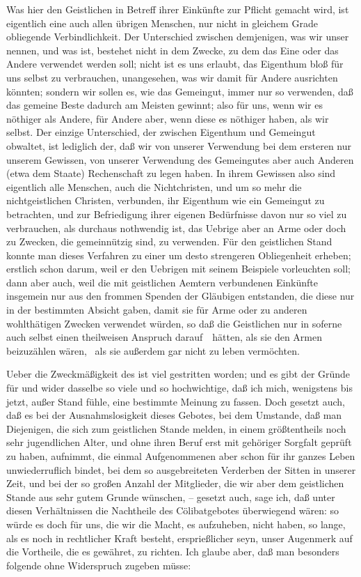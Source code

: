 \begin{aufza}
\item Was hier den Geistlichen in Betreff ihrer Einkünfte zur Pflicht gemacht wird, ist eigentlich eine auch allen übrigen Menschen, nur nicht in gleichem Grade obliegende Verbindlichkeit. Der Unterschied zwischen demjenigen, was wir unser  nennen, und was  ist, bestehet nicht in dem Zwecke, zu dem das Eine oder das Andere verwendet werden soll; nicht ist es uns erlaubt, das Eigenthum bloß für uns selbst zu verbrauchen, unangesehen, was wir damit für Andere ausrichten könnten; sondern wir sollen es, wie das Gemeingut, immer nur so verwenden, daß das gemeine Beste dadurch am Meisten gewinnt; also für uns, wenn wir es nöthiger als Andere, für Andere aber, wenn diese es nöthiger haben, als wir selbst. Der einzige Unterschied, der zwischen Eigenthum und Gemeingut obwaltet, ist lediglich der, daß wir von unserer Verwendung bei dem ersteren nur unserem Gewissen, von unserer Verwendung des Gemeingutes aber auch Anderen (etwa dem Staate) Rechenschaft zu legen haben. In ihrem Gewissen also sind eigentlich alle Menschen, auch die Nichtchristen, und um so mehr die nichtgeistlichen Christen, verbunden, ihr Eigenthum wie ein Gemeingut zu betrachten, und zur Befriedigung ihrer eigenen Bedürfnisse davon nur so viel zu verbrauchen, als durchaus nothwendig ist, das Uebrige aber an Arme oder doch zu Zwecken, die gemeinnützig sind, zu verwenden. Für den geistlichen Stand konnte man dieses Verfahren zu einer um desto strengeren Obliegenheit erheben; erstlich schon darum, weil er den Uebrigen mit seinem Beispiele vorleuchten soll; dann aber auch, weil die mit geistlichen Aemtern verbundenen Einkünfte insgemein nur aus den frommen Spenden der Gläubigen entstanden, die diese nur in der bestimmten Absicht gaben, damit sie für Arme oder zu anderen wohlthätigen Zwecken verwendet würden, so daß die Geistlichen nur in soferne auch selbst einen theilweisen Anspruch darauf~\ hätten, als sie den Armen beizuzählen wären, \dh\  als sie außerdem gar nicht zu leben vermöchten.
\item Ueber die Zweckmäßigkeit des  ist viel gestritten worden; und es gibt der Gründe für und wider dasselbe so viele und so hochwichtige, daß ich mich, wenigstens bis jetzt, außer Stand fühle, eine bestimmte Meinung zu fassen. Doch gesetzt auch, daß es bei der Ausnahmslosigkeit dieses Gebotes, bei dem Umstande, daß man Diejenigen, die sich zum geistlichen Stande melden, in einem größtentheils noch sehr jugendlichen Alter, und ohne ihren Beruf erst mit gehöriger Sorgfalt geprüft zu haben, aufnimmt, die einmal Aufgenommenen aber schon für ihr ganzes Leben unwiederruflich bindet, bei dem so ausgebreiteten Verderben der Sitten in unserer Zeit, und bei der so großen Anzahl der Mitglieder, die wir aber dem geistlichen Stande aus sehr gutem Grunde wünschen, -- gesetzt auch, sage ich, daß unter diesen Verhältnissen die Nachtheile des Cölibatgebotes überwiegend wären: so würde es doch für uns, die wir die Macht, es aufzuheben, nicht haben, so lange, als es noch in rechtlicher Kraft besteht, ersprießlicher seyn, unser Augenmerk auf die Vortheile, die es gewähret, zu richten. Ich glaube aber, daß man besonders folgende ohne Widerspruch zugeben müsse:

\end{aufza}
